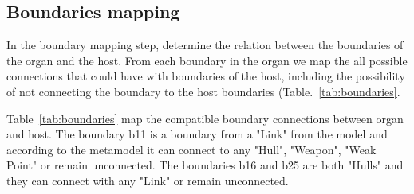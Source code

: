 \subsection{Boundaries mapping}

In the boundary mapping step, \ApproachName{} determine the relation between the boundaries of the organ and the host. From each boundary in the organ we map the all possible connections that could have with boundaries of the host, including the possibility of not connecting the boundary to the host boundaries (Table.~\ref{tab:boundaries}. 

Table~\ref{tab:boundaries} map the compatible boundary connections between organ and host. The boundary b11 is a boundary from a "Link" from the model and according to the metamodel it can connect to any "Hull", "Weapon", "Weak Point" or remain unconnected. The boundaries b16 and b25 are both "Hulls" and they can connect with any "Link" or remain unconnected.

